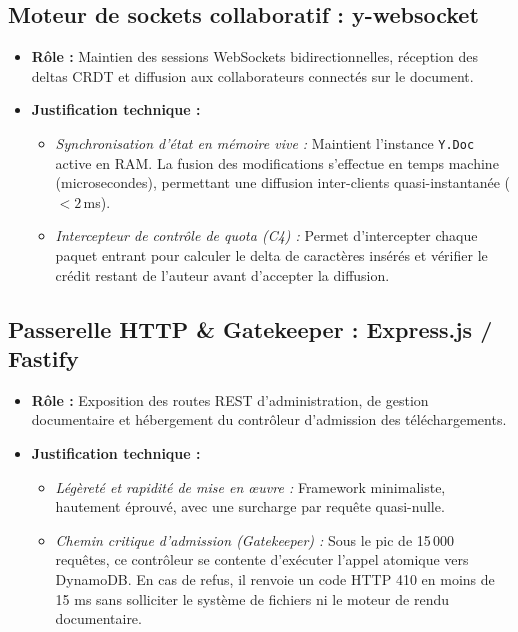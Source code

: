 \subsection{Moteur de sockets collaboratif : y-websocket}
\begin{itemize}
    \item \textbf{Rôle :} Maintien des sessions WebSockets bidirectionnelles, réception des deltas CRDT et diffusion aux collaborateurs connectés sur le document.
    \item \textbf{Justification technique :} 
    \begin{itemize}
        \item \emph{Synchronisation d'état en mémoire vive :} Maintient l'instance \texttt{Y.Doc} active en RAM. La fusion des modifications s'effectue en temps machine (microsecondes), permettant une diffusion inter-clients quasi-instantanée ($< 2$\,ms).
        \item \emph{Intercepteur de contrôle de quota (C4) :} Permet d'intercepter chaque paquet entrant pour calculer le delta de caractères insérés et vérifier le crédit restant de l'auteur avant d'accepter la diffusion.
    \end{itemize}
\end{itemize}

\subsection{Passerelle HTTP \& Gatekeeper : Express.js / Fastify}
\begin{itemize}
    \item \textbf{Rôle :} Exposition des routes REST d'administration, de gestion documentaire et hébergement du contrôleur d'admission des téléchargements.
    \item \textbf{Justification technique :} 
    \begin{itemize}
        \item \emph{Légèreté et rapidité de mise en œuvre :} Framework minimaliste, hautement éprouvé, avec une surcharge par requête quasi-nulle.
        \item \emph{Chemin critique d'admission (Gatekeeper) :} Sous le pic de 15\,000 requêtes, ce contrôleur se contente d'exécuter l'appel atomique vers DynamoDB. En cas de refus, il renvoie un code HTTP 410 en moins de 15 ms sans solliciter le système de fichiers ni le moteur de rendu documentaire.
    \end{itemize}
\end{itemize}

